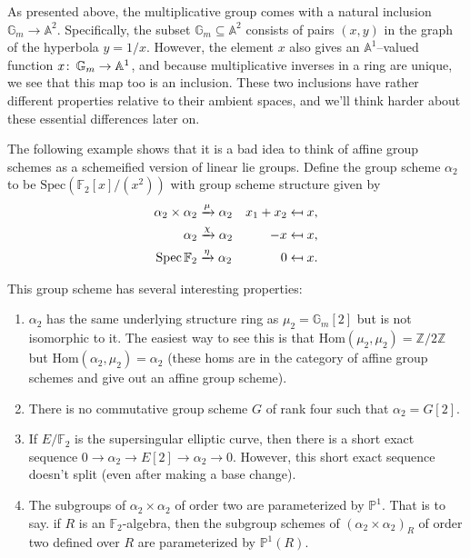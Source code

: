 \begin{remark}
As presented above, the multiplicative group comes with a natural inclusion $\mathbb G_m \to \mathbb A^2$.  Specifically, the subset $\mathbb G_m \subseteq \mathbb A^2$ consists of pairs $(x, y)$ in the graph of the hyperbola $y = 1/x$.  However, the element $x$ also gives an $\mathbb A^1$--valued function $x\colon\thinspace \mathbb G_m \to \mathbb A^1$, and because multiplicative inverses in a ring are unique, we see that this map too is an inclusion.  These two inclusions have rather different properties relative to their ambient spaces, and we'll think harder about these essential differences later on.
\end{remark}

\begin{example}\label{Alpha2Example}
The following example shows that it is a bad idea to think of affine group schemes as a schemeified version of linear lie groups.  Define the group scheme $\alpha_2$ to be $\mathrm{Spec}(\mathbb{F}_2[x]/(x^2))$ with group scheme structure given by
\begin{align*}
\alpha_2 \times \alpha_2 &\xrightarrow{\mu} \alpha_2 & x_1 + x_2 & \mapsfrom x, \\
\alpha_2 & \xrightarrow{\chi} \alpha_2 & -x & \mapsfrom x, \\
\operatorname{Spec} \mathbb F_2 & \xrightarrow{\eta} \alpha_2 & 0 & \mapsfrom x.
\end{align*}

This group scheme has several interesting properties:
\begin{enumerate}
\item $\alpha_2$ has the same underlying structure ring as $\mu_2 = \mathbb{G}_m[2]$ but is not isomorphic to it.  The easiest way to see this is that $\mathrm{Hom}(\mu_2, \mu_2) = \mathbb{Z}/2\mathbb{Z}$ but $\mathrm{Hom}(\alpha_2, \mu_2) = \alpha_2$ (these homs are in the category of affine group schemes and give out an affine group scheme).  
\item There is no commutative group scheme $G$ of rank four such that $\alpha_2 = G[2]$.
\item If $E/\mathbb{F}_2$ is the supersingular elliptic curve, then there is a short exact sequence $0 \rightarrow \alpha_2 \rightarrow E[2] \rightarrow \alpha_2 \rightarrow 0$.  However, this short exact sequence doesn't split (even after making a base change).
\item The subgroups of $\alpha_2 \times \alpha_2$ of order two are parameterized by $\mathbb{P}^1$.  That is to say. if $R$ is an $\mathbb{F}_2$-algebra, then the subgroup schemes of $(\alpha_2 \times \alpha_2)_R$ of order two defined over $R$ are parameterized by $\mathbb{P}^1(R)$.
\end{enumerate}
\end{example}

